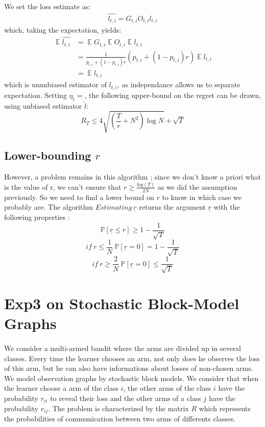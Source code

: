 \documentclass[11pt,a4paper]{article}
\DeclareMathOperator*{\expect}{\mathbb{E}}
\begin{document}
We set the loss estimate as:
\begin{align*}
\hat{l_{t,i}}=G_{t,i}O_{t,i}l_{t,i}
\end{align*}
which, taking the expectation, yields:
\begin{align*}
\expect{\hat{l_{t,i}}}&=\expect{G_{t,i}}\expect{O_{t,i}}\expect{l_{t,i}} \\
&= \frac{1}{p_{t,i}+(1-p_{t,i})r} \left(p_{t,i}+(1-p_{t,i})r\right) \expect{l_{t,i}} \\
&= \expect{l_{t,i}}
\end{align*}
which is ununbiased estimator of $l_{t,i}$, as independance allows us to separate expectation. Setting $\eta_t = $, the following upper-bound on the regret can be drawn, using unbiased estimator $\hat l$:
\[
R_T \leq 4 \sqrt{\left(\frac{T}{r}+N^2\right)\log N}+\sqrt{T}
\]
\subsection{Lower-bounding $r$}
However, a problem remains in this algorithm ; since we don't know a priori what is the value of r, we can't ensure that $ r\geq \frac{log(T)}{2N}$ as we did the assumption previously. So we need to find a lower bound on $r$ to know in which case we probably are. The algorithm $Estimating\ \underline{r}$ returns the argument $\underline{r}$ with the following properties : 
\[
\mathbb{P} [\underline{r}\leq r]\geq 1-\frac{1}{\sqrt{T}}
\]
\[
if\ r\leq \frac{1}{N}\ \mathbb{P} [\underline{r}=0]=1-\frac{1}{\sqrt{T}} 
\]
\[
if\ r\geq \frac{2}{N}\ \mathbb{P} [\underline{r}=0]\leq \frac{1}{\sqrt{T}} 
\]

\section{Exp3 on Stochastic Block-Model Graphs}

\paragraph{}We consider a multi-armed bandit where the arms are divided up in several classes. Every time the learner chooses an arm, not only does he observes the loss of this arm, but he can also have informations about losses of non-chosen arms. We model observation graphs by stochastic block models. We consider that when the learner choose a arm of the class $i$, the other arms of the class $i$ have the probability $r_{ii}$ to reveal their loss and the other arms of a class $j$ have the probability $r_{ij}$. The problem is characterized by the matrix $R$ which represents the probabilities of communication between two arms of differents classes.
\end{document}
